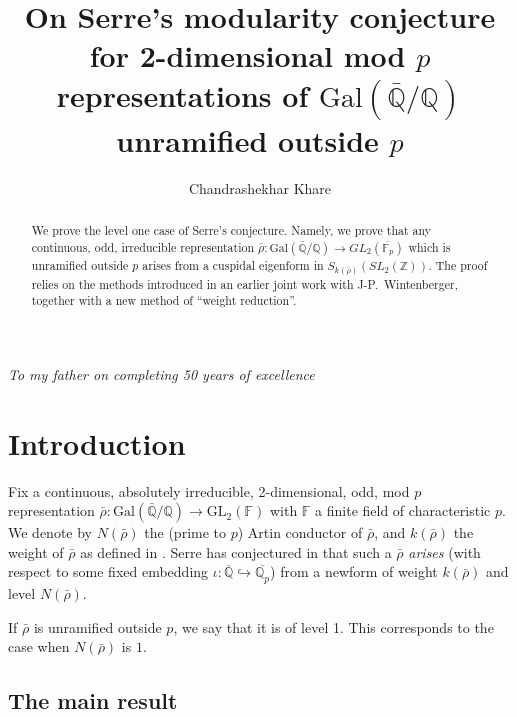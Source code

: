 \documentclass[12pt]{amsart}
\newcommand{\aQ}{\overline{\mathbb{Q}}}
\newcommand{\Z}{\mathbb{Z}}
\newcommand{\aFp}{\overline{\mathbb{F}_{p}}}
\newcommand{\aQp}{\overline{\mathbb{Q}_{p}}}
\newcommand{\GL}{\mathrm{GL}}
\newcommand{\rhobar}{\overline{\rho}}
\def\rhobar{ {\bar {\rho} } }
\def\rhob{ {\bar {\rho} } }
\newcommand{\Galois}{\mathrm{Gal}}
\newcommand{\Gal}{\Galois( \bar{ {\mathbb Q}}/{\mathbb Q})}
\newcommand{\F}{{\mathbb F}}
\begin{document}
\title[The level 1 case of Serre's conjecture]
{On Serre's modularity conjecture for 2-dimensional mod $p$
 representations of $\Gal$ unramified outside $p$}
\author[Chandrashekhar Khare]{Chandrashekhar Khare}
\address{Department of Mathematics \\
         155 South 1400 East, Room 233 \\
           Salt Lake City, UT 84112-0090 \\
         U.S.A.}


\maketitle

\centerline{\it To my father on completing 50 years of excellence}

\begin{abstract}
We prove the level one case of Serre's conjecture. Namely, we prove that
any
continuous, odd, irreducible representation $\rhobar:\Gal \rightarrow
GL_2(\aFp)$ which is unramified outside $p$ arises from a cuspidal eigenform in
$S_{k(\rhobar)}(SL_2(\Z))$. The proof relies on the methods introduced in 
an earlier joint work with J-P.~Wintenberger, together with a new method 
of ``weight reduction''. 
\end{abstract}




\tableofcontents



\section{Introduction}

Fix a continuous, absolutely irreducible, 2-dimensional, odd, mod $p$ representation
$\rhob:\Gal \rightarrow \GL_2(\F)$ with $\F$ a finite field of
characteristic $p$.
We denote by $N(\rhobar)$ the (prime to $p$) Artin conductor of $\rhobar$, and 
$k(\rhobar)$ the weight of $\rhobar$ as defined in \cite{Serre3}. Serre has conjectured in \cite{Serre3} that such a $\rhob$ {\it arises} (with respect to some fixed embedding $\iota:\aQ \hookrightarrow \aQp$) from a newform of weight $k(\rhobar)$ and level $N(\rhobar)$. 

If $\rhob$ is unramified outside $p$, we say that it is of level 1.
This corresponds to the case 
when $N(\rhobar)$ is $1$. 


\subsection{The main result}
\end{document}
